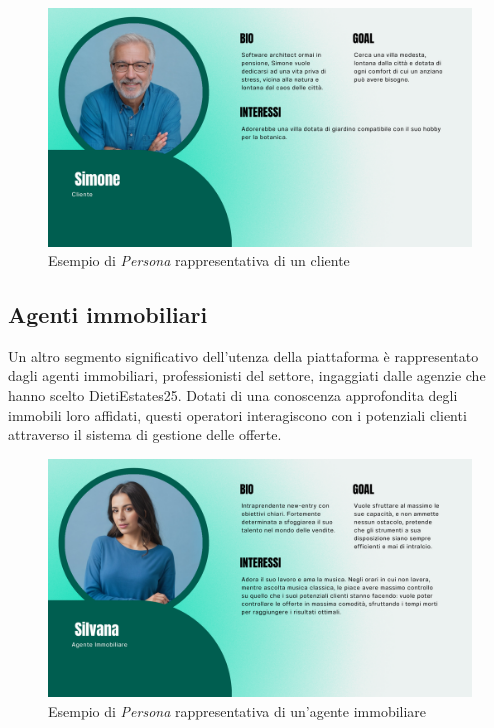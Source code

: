 \documentclass{book}
\begin{document}
\begin{figure}[!htb]
    \includegraphics[width=\textwidth]{figures/oldclientPersona.pdf}
    \centering
    \caption{Esempio di \textit{Persona} rappresentativa di un cliente}
\end{figure}

\cleardoublepage
\subsection{Agenti immobiliari}
Un altro segmento significativo dell'utenza della piattaforma è rappresentato dagli agenti immobiliari, professionisti del settore, ingaggiati dalle agenzie che hanno scelto DietiEstates25. Dotati di una conoscenza approfondita degli immobili loro affidati, questi operatori interagiscono con i potenziali clienti attraverso il sistema di gestione delle offerte.

\begin{figure}[!htb]
    \includegraphics[width=\textwidth]{figures/reagentPersona.pdf}
    \centering
    \caption{Esempio di \textit{Persona} rappresentativa di un'agente immobiliare}
\end{figure}
\end{document}

